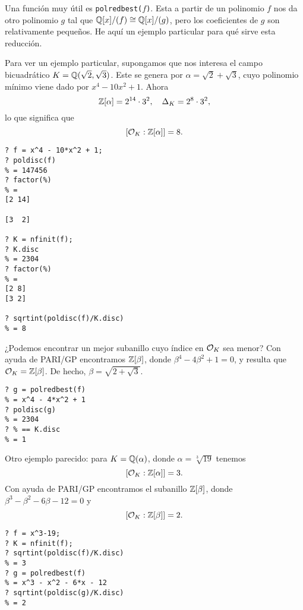 \vspace{1em}

Una función muy útil es \texttt{polredbest($f$)}. Esta a partir de un polinomio
$f$ nos da otro polinomio $g$ tal que $\mathbb{Q}[x]/(f) \cong \mathbb{Q}[x]/(g)$, pero los
coeficientes de $g$ son relativamente pequeños. He aquí un ejemplo particular
para qué sirve esta reducción.

Para ver un ejemplo particular, supongamos que nos interesa el campo
bicuadrático $K = \mathbb{Q} (\sqrt{2},\sqrt{3})$.  Este se genera por
$\alpha = \sqrt{2} + \sqrt{3}$, cuyo polinomio mínimo viene dado por
$x^4 - 10 x^2 + 1$. Ahora
$$\mathbb{Z} [\alpha] = 2^{14}\cdot 3^2, \quad \Delta_K = 2^8\cdot 3^2,$$
lo que significa que
$$[\mathcal{O}_K : \mathbb{Z} [\alpha]] = 8.$$

\begin{shaded}
\begin{verbatim}
? f = x^4 - 10*x^2 + 1;
? poldisc(f)
% = 147456
? factor(%)
% = 
[2 14]

[3  2]

? K = nfinit(f);
? K.disc 
% = 2304
? factor(%)
% = 
[2 8]
[3 2]

? sqrtint(poldisc(f)/K.disc)
% = 8
\end{verbatim}
\end{shaded}

¿Podemos encontrar un mejor subanillo cuyo índice en $\mathcal{O}_K$ sea menor?
Con ayuda de PARI/GP encontramos $\mathbb{Z} [\beta]$, donde
$\beta^4 - 4\beta^2 + 1 = 0$, y resulta que $\mathcal{O}_K = \mathbb{Z} [\beta]$.
De hecho, $\beta = \sqrt{2 + \sqrt{3}}$.

\begin{shaded}
\begin{verbatim}
? g = polredbest(f)
% = x^4 - 4*x^2 + 1
? poldisc(g)
% = 2304
? % == K.disc 
% = 1
\end{verbatim}
\end{shaded}

Otro ejemplo parecido: para $K = \mathbb{Q} (\alpha)$, donde $\alpha = \sqrt[3]{19}$
tenemos
$$[\mathcal{O}_K : \mathbb{Z} [\alpha]] = 3.$$
Con ayuda de PARI/GP encontramos el subanillo $\mathbb{Z} [\beta]$, donde
$\beta^3 - \beta^2 - 6\beta - 12 = 0$ y
$$[\mathcal{O}_K : \mathbb{Z} [\beta]] = 2.$$

\begin{shaded}
\begin{verbatim}
? f = x^3-19;
? K = nfinit(f);
? sqrtint(poldisc(f)/K.disc)
% = 3
? g = polredbest(f)
% = x^3 - x^2 - 6*x - 12
? sqrtint(poldisc(g)/K.disc)
% = 2
\end{verbatim}
\end{shaded}

